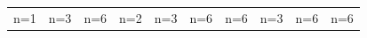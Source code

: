 \documentclass[letterpaper]{article} %
\begin{document}
\begin{figure}[!htbp]
\centering
\footnotesize
\begin{tabular}{cccccccccc}
\multicolumn{1}{c}{n=1} \hspace{-11pt} &
\multicolumn{1}{c}{n=3} \hspace{-11pt} &
\multicolumn{1}{c}{n=6} \hspace{-11pt} &
\multicolumn{1}{c}{n=2} \hspace{-11pt} &
\multicolumn{1}{c}{n=3} \hspace{-11pt} &
\multicolumn{1}{c}{n=6} \hspace{-11pt} &
\multicolumn{1}{c}{n=6} \hspace{-11pt} &
\multicolumn{1}{c}{n=3} \hspace{-11pt} &
\multicolumn{1}{c}{n=6} \hspace{-11pt} &
\multicolumn{1}{c}{n=6} \\


\end{tabular}
\end{figure}
\end{document}
